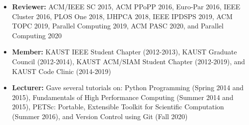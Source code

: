 \documentclass[9pt,a4paper]{extarticle}
\begin{document}
{
\begin{itemize}
\item
\textbf{Reviewer:} ACM/IEEE SC 2015, ACM PPoPP 2016, Euro-Par 2016, IEEE Cluster 2016,
PLOS One 2018, IJHPCA 2018, IEEE IPDSPS 2019, ACM TOPC 2019, Parallel Computing 2019,
ACM PASC 2020, and Parallel Computing 2020
\item
\textbf{Member:} KAUST IEEE Student Chapter (2012-2013),
KAUST Graduate Council (2012-2014), KAUST ACM/SIAM Student Chapter (2012-2019),
and KAUST Code Clinic (2014-2019)
\item
\textbf{Lecturer:} Gave several tutorials on: Python Programming (Spring 2014 and 2015),
Fundamentals of High Performance Computing (Summer 2014 and 2015),
PETSc: Portable, Extensible Toolkit for Scientific Computation (Summer 2016),
and Version Control using Git (Fall 2020)
\end{itemize}
}
\end{document}
